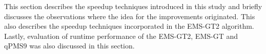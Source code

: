 This section describes the speedup techniques introduced in this study and briefly discusses the observations where the idea for the improvements originated. This also describes the speedup techniques incorporated in the EMS-GT2 algorithm. Lastly, evaluation of runtime performance of the EMS-GT2, EMS-GT and qPMS9 was also discussed in this section.

% 








